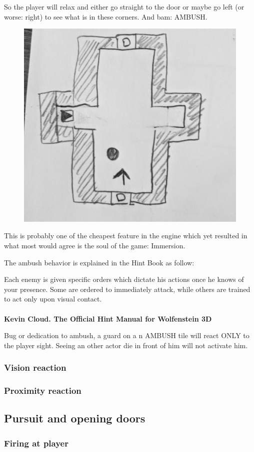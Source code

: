 \begin{minipage}{.45\textwidth}
So the player will relax and either go straight to the door or maybe go left (or worse: right) to see what is in these corners. And bam: AMBUSH.
\end{minipage}
\begin{minipage}{.45\textwidth}
\par
\begin{figure}[H]
 \centering
 \includegraphics[width=.5\textwidth]{imgs/ambush/map_ambushed_drawing.png}
\end{figure}
\end{minipage}

\par
This is probably one of the cheapest feature in the engine which yet resulted in what most would agree is the soul of the game: Immersion.\\
\par

 The ambush behavior is explained in the Hint Book as follow:\\
\par
\begin{fancyquotes}
Each enemy is given specific orders which dictate his actions once he knows of your presence. Some are ordered to immediately attack, while others are trained to act only upon visual contact.
 \bigskip \\
\bigskip \\
\textbf{Kevin Cloud. The Official Hint Manual for Wolfenstein 3D}
 \end{fancyquotes}

 Bug or dedication to ambush, a guard on a n AMBUSH tile will react ONLY to the player sight. Seeing an other actor die in front of him will not activate him.\\

\subsubsection{Vision reaction}
\subsubsection{Proximity reaction}
\subsection{Pursuit and opening doors}

\subsubsection{Firing at player}






